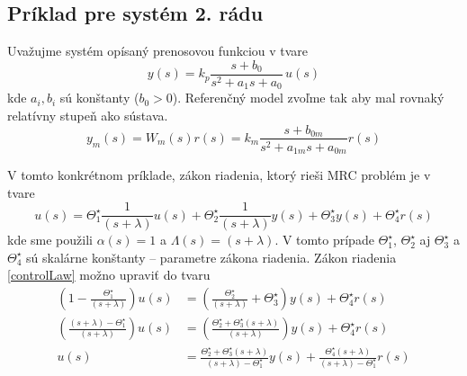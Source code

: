 \documentclass[a4paper, 10pt, ]{article}
\begin{document}
\subsection{Príklad pre systém 2. rádu}
\label{MRCproblemPriklad}



Uvažujme systém opísaný prenosovou funkciou v tvare
\begin{equation} \label{genaralFormOfPlant04}
	y(s) = k_p \frac{s + b_0}{ s^2 + a_1 s + a_0} \, u(s)
\end{equation}
kde $a_i, b_i$ sú konštanty ($b_0 > 0$). Referenčný model zvoľme tak aby mal rovnaký relatívny stupeň ako sústava.
\begin{equation}
	y_m(s) = W_m(s)r(s) = k_m \frac{s + b_{0m}}{ s^2 + a_{1m} s + a_{0m}} r(s)
\end{equation}

V tomto konkrétnom príklade, zákon riadenia, ktorý rieši MRC problém je v tvare
\begin{equation} \label{controlLaw}
	u(s) = \Theta_1^\star \frac{1}{(s + \lambda)} u(s) + \Theta_2^\star \frac{1}{(s + \lambda)} y(s) + \Theta_3^\star y(s) + \Theta_4^\star r(s)
\end{equation}
kde sme použili $\alpha(s) = 1$ a $\Lambda(s) = (s + \lambda)$. V tomto prípade $\Theta_1^\star$, $\Theta_2^\star$ aj $\Theta_3^\star$ a $\Theta_4^\star$ sú skalárne konštanty -- parametre zákona riadenia.
Zákon riadenia \eqref{controlLaw} možno upraviť do tvaru
\begin{subequations}
	\begin{align}
		\left( 1 - \frac{ \Theta_1^\star }{ (s + \lambda)} \right) u(s)
		&=
		\left( \frac{ \Theta_2^\star }{ (s + \lambda)} + \Theta_3^\star \right) y(s) + \Theta_4^\star r(s)
		\\
        \left( \frac{ (s + \lambda) - \Theta_1^\star }{ (s + \lambda)} \right) u(s)
		& =
		\left( \frac{ \Theta_2^\star + \Theta_3^\star (s + \lambda) }{ (s + \lambda)} \right) y(s) + \Theta_4^\star r(s)
		\\
		\label{controlLaw04_2}
		u(s) &= \frac{\Theta_2^\star + \Theta_3^\star (s + \lambda)}{(s + \lambda) - \Theta_1^\star} y(s) + \frac{ \Theta_4^\star (s + \lambda)}{(s + \lambda) - \Theta_1^\star} r(s)
	\end{align}
\end{subequations}
\end{document}
